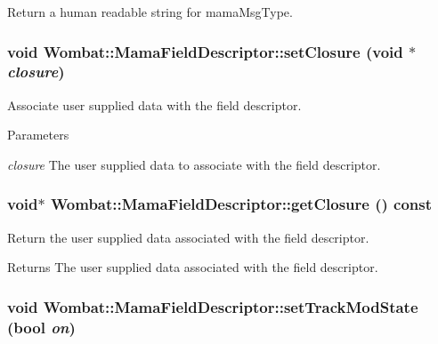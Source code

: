 Return a human readable string for mamaMsgType. \hypertarget{classWombat_1_1MamaFieldDescriptor_aec2dcca9943ce8f387ca6aafa97e89ec}{
\subsubsection[{setClosure}]{\setlength{\rightskip}{0pt plus 5cm}void Wombat::MamaFieldDescriptor::setClosure (void $\ast$ {\em closure})}}
\label{classWombat_1_1MamaFieldDescriptor_aec2dcca9943ce8f387ca6aafa97e89ec}


Associate user supplied data with the field descriptor. 
\begin{DoxyParams}{Parameters}
\item[{\em closure}]The user supplied data to associate with the field descriptor. \end{DoxyParams}
\hypertarget{classWombat_1_1MamaFieldDescriptor_ad11ddda5a1c9133ad00401ef3fe8aedd}{
\subsubsection[{getClosure}]{\setlength{\rightskip}{0pt plus 5cm}void$\ast$ Wombat::MamaFieldDescriptor::getClosure () const}}
\label{classWombat_1_1MamaFieldDescriptor_ad11ddda5a1c9133ad00401ef3fe8aedd}


Return the user supplied data associated with the field descriptor. \begin{DoxyReturn}{Returns}
The user supplied data associated with the field descriptor. 
\end{DoxyReturn}
\hypertarget{classWombat_1_1MamaFieldDescriptor_a295210e0265a662fea3967fcbac4d674}{
\subsubsection[{setTrackModState}]{\setlength{\rightskip}{0pt plus 5cm}void Wombat::MamaFieldDescriptor::setTrackModState (bool {\em on})}}
\label{classWombat_1_1MamaFieldDescriptor_a295210e0265a662fea3967fcbac4d674}


